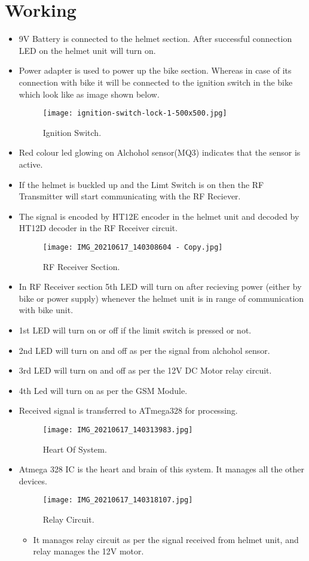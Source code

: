 \chapter{Working} 
\begin{itemize}
	\item 9V Battery is connected to the helmet section. After successful connection LED on the helmet unit will turn on.
	\item Power adapter is used to power up the bike section. Whereas in case of its connection with bike it will be connected to the ignition switch in the bike which look like as image shown below.
	\begin{figure}[h]
		\centering
		\texttt{[image: ignition-switch-lock-1-500x500.jpg]}
		\caption{Ignition Switch.}
	\end{figure}
	\item Red colour led glowing on Alchohol sensor(MQ3) indicates that the sensor is active.
	\item If the helmet is buckled up and the Limt Switch is on then the RF Transmitter will start communicating with the RF Reciever. \item The signal is encoded by HT12E encoder in the helmet unit and decoded by HT12D decoder in the RF Receiver circuit.
	
	\begin{figure}[h]
		\centering
		\texttt{[image: IMG\_20210617\_140308604 - Copy.jpg]}
		\caption{RF Receiver Section.}
	\end{figure}
	\item In RF Receiver section 5th LED will turn on after recieving power (either by bike or power supply) whenever the helmet unit is in range of communication with bike unit.
	\item 1st LED will turn on or off if the limit switch is pressed or not.
	\item 2nd LED will turn on and off as per the signal from alchohol sensor.
	\item 3rd LED will turn on and off as per the 12V DC Motor relay circuit.
	\item 4th Led will turn on as per the GSM Module.
	\item Received signal is transferred to ATmega328 for processing.
	\begin{figure}[h]
		\centering
		\texttt{[image: IMG\_20210617\_140313983.jpg]}
		\caption{Heart Of System.}
	\end{figure}
	
	\item Atmega 328 IC is the heart and brain of this system. It manages all the other devices.
	\begin{figure}[h]
		\centering
		\texttt{[image: IMG\_20210617\_140318107.jpg]}
		\caption{Relay Circuit.}
	\end{figure}
	\begin{itemize}
		\item It manages relay circuit as per the signal received from helmet unit, and relay manages the 12V motor.
		

\end{itemize}
\end{itemize}
